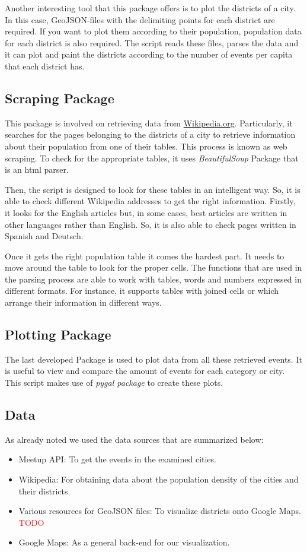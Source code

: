Another interesting tool that this package offers is to plot the districts of a city. In this case, GeoJSON-files with the delimiting points for each district are required. If you want to plot them according to their population, population data for each district is also required. The script reads these files, parses the data and it can plot and paint the districts according to the number of events per capita that each district has.

\subsection{Scraping Package}
This package is involved on retrieving data from \url{Wikipedia.org}. Particularly, it searches for the pages belonging to the districts of a city to retrieve information about their population from one of their tables. This process is known as web scraping. To check for the appropriate tables, it uses \textit{BeautifulSoup} Package that is an html parser.

Then, the script is designed to look for these tables in an intelligent way.  So, it is able to check different Wikipedia addresses to get the right information.  Firstly, it looks for the English articles but, in some cases, best articles are written in other languages rather than English. So, it is also able to check pages written in Spanish and Deutsch.

Once it gets the right population table it comes the hardest part. It needs to move around the table to look for the proper cells. The functions that are used in the parsing process are able to work with tables, words and numbers expressed in different formats. For instance, it supports tables with joined cells or which arrange their information in different ways.

\subsection{Plotting Package}
The last developed Package is used to plot data from all these retrieved events. It is useful to view and compare the amount of events for each category or city. This script makes use of \textit{pygal package} to create these plots. 

\subsection{Data}

As already noted we used the data sources that are summarized below:

\begin{itemize}
\item Meetup API: To get the events in the examined cities. 
\item Wikipedia: For obtaining data about the population density of the cities and their districts. 
\item Various resources for GeoJSON files: To visualize districts onto Google Maps. \textcolor{red}{TODO}
\item Google Maps: As a general back-end for our visualization.  
\end{itemize}